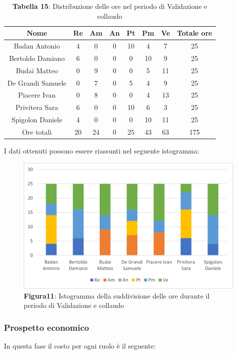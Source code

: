 \begin{table}[H]
	\centering
	\renewcommand{\arraystretch}{1.5}
	\begin{tabular}{|c|c|c|c|c|c|c|c|}
		\hline
		\rowcolor{lighter-grayer}
		Nome & Re & Am & An & Pt & Pm & Ve & Totale ore\\
		\hline
		Badan Antonio & 4 & 0 & 0 &  10 & 4 & 7 & 25 \\
		\hline
		Bertoldo Damiano & 6 & 0 & 0 & 0 & 10 & 9 & 25 \\
		\hline
		Budai Matteo & 0 & 9 & 0 & 0 & 5 & 11 & 25 \\
		\hline
		De Grandi Samuele & 0 & 7 & 0 & 5 & 4 & 9 & 25 \\
		\hline
		Piacere Ivan & 0 & 8 & 0 & 0 & 4 & 13 & 25 \\
		\hline
		Privitera Sara & 6 & 0 & 0 & 10 & 6 & 3 & 25 \\
		\hline
		Spigolon Daniele & 4 & 0 & 0 & 0 & 10 & 11 & 25 \\
		\hline
		Ore totali & 20 & 24 & 0 & 25 & 43 & 63 & 175 \\
		\hline
	\end{tabular}
	\caption*{\textbf{Tabella 15}: Distribuzione delle ore nel periodo di Validazione e collaudo\\}
\end{table}	
	I dati ottenuti possono essere riassunti nel seguente istogramma:

\begin{figure}[H]
	\centering
	\includegraphics[width=0.7\linewidth]{res/images/Figura11.png}
	\caption*{\textbf{Figura11}: Istogramma della suddivisione delle ore durante il periodo di Validazione e collaudo}
	\label{fig:Figura10}
\end{figure}
	
	
\subsubsection{Prospetto economico}
In questa fase il costo per ogni ruolo è il seguente:

